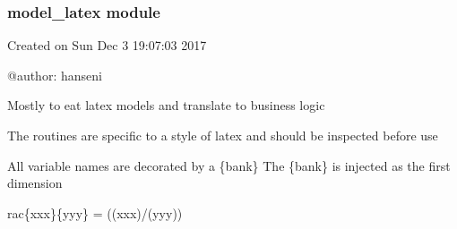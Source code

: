 \documentclass[letterpaper,10pt,english]{sphinxmanual}
\begin{document}
\sphinxstepscope


\subsubsection{model\_latex module}
\label{\detokenize{onboard/model_latex:module-model_latex}}\label{\detokenize{onboard/model_latex:model-latex-module}}\label{\detokenize{onboard/model_latex::doc}}
\sphinxAtStartPar
Created on Sun Dec  3 19:07:03 2017

\sphinxAtStartPar
@author: hanseni

\sphinxAtStartPar
Mostly to eat latex models and translate to business logic

\sphinxAtStartPar
The routines are specific to a style of latex and should be inspected before use

\begin{fulllineitems}
\label{\detokenize{onboard/model_latex:model_latex.rebank}}
\pysigstartsignatures
{}
\pysigstopsignatures
\sphinxAtStartPar
All variable names are decorated by a \{bank\}
The \{bank\} is injected as the first dimension

\end{fulllineitems}


\begin{fulllineitems}
\label{\detokenize{onboard/model_latex:model_latex.txttolatex}}
\pysigstartsignatures
{}
\pysigstopsignatures
\end{fulllineitems}


\begin{fulllineitems}
\label{\detokenize{onboard/model_latex:model_latex.defrack}}
\pysigstartsignatures
{}
\pysigstopsignatures
\sphinxAtStartPar
rac\{xxx\}\{yyy\} = ((xxx)/(yyy))

\end{fulllineitems}
\end{document}
